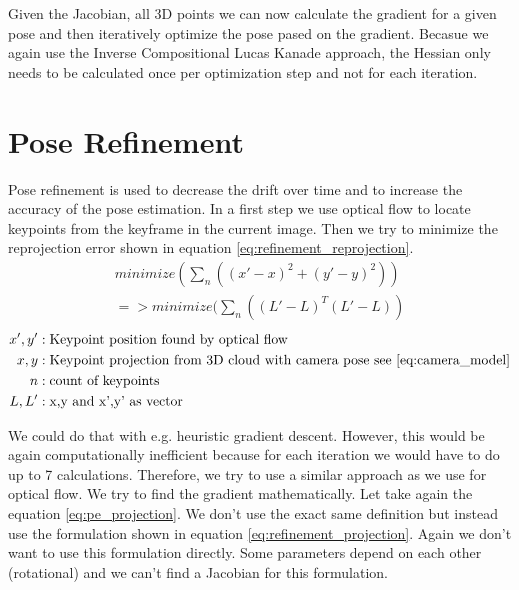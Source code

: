 \documentclass[11pt,a4paper,titlepage,oneside]{report}
\begin{document}
Given the Jacobian, all 3D points we can now calculate the gradient for a given pose and then iteratively optimize the pose pased on the gradient. Becasue we again use the Inverse Compositional Lucas Kanade approach, the Hessian only needs to be calculated once per optimization step and not for each iteration.

\chapter{Pose Refinement}\label{ch:pose_refinement}

Pose refinement is used to decrease the drift over time and to increase the accuracy of the pose estimation. In a first step we use optical flow to locate keypoints from the keyframe in the current image. Then we try to minimize the reprojection error shown in equation \ref{eq:refinement_reprojection}.
\begin{equation}\label{eq:refinement_reprojection}
  \begin{gathered}
    minimize(\sum_n ((x'-x)^2+(y'-y)^2))\\
    =>minimize(\sum_n ((L'-L)^T(L'-L))
  \end{gathered}
\end{equation}
\begin{align*}
  x',y'   &: \text{Keypoint position found by optical flow}\\
  x,y     &: \text{Keypoint projection from 3D cloud with camera pose see \ref{eq:camera_model}}\\
  n       &: \text{count of keypoints}\\
  L,L'    &: \text{x,y and x',y' as vector}
\end{align*}

We could do that with e.g. heuristic gradient descent. However, this would be again computationally inefficient because for each iteration we would have to do up to 7 calculations. Therefore, we try to use a similar approach as we use for optical flow. We try to find the gradient mathematically. Let take again the equation \ref{eq:pe_projection}. We don't use the exact same definition but instead use the formulation shown in equation \ref{eq:refinement_projection}. Again we don't want to use this formulation directly. Some parameters depend on each other (rotational) and we can't find a Jacobian for this formulation.
\end{document}
